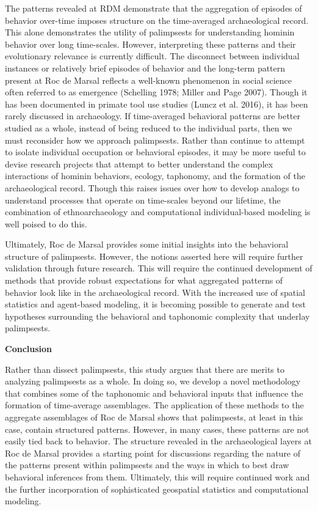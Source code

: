 \documentclass[smallextended]{svjour3}       %
\begin{document}
The patterns revealed at RDM demonstrate that the aggregation of
episodes of behavior over-time imposes structure on the time-averaged
archaeological record. This alone demonstrates the utility of
palimpsests for understanding hominin behavior over long time-scales.
However, interpreting these patterns and their evolutionary relevance is
currently difficult. The disconnect between individual instances or
relatively brief episodes of behavior and the long-term pattern present
at Roc de Marsal reflects a well-known phenomenon in social science
often referred to as emergence (Schelling 1978; Miller and Page 2007).
Though it has been documented in primate tool use studies (Luncz et al.
2016), it has been rarely discussed in archaeology. If time-averaged
behavioral patterns are better studied as a whole, instead of being
reduced to the individual parts, then we must reconsider how we approach
palimpsests. Rather than continue to attempt to isolate individual
occupation or behavioral episodes, it may be more useful to devise
research projects that attempt to better understand the complex
interactions of hominin behaviors, ecology, taphonomy, and the formation
of the archaeological record. Though this raises issues over how to
develop analogs to understand processes that operate on time-scales
beyond our lifetime, the combination of ethnoarchaeology and
computational individual-based modeling is well poised to do this.

Ultimately, Roc de Marsal provides some initial insights into the
behavioral structure of palimpsests. However, the notions asserted here
will require further validation through future research. This will
require the continued development of methods that provide robust
expectations for what aggregated patterns of behavior look like in the
archaeological record. With the increased use of spatial statistics and
agent-based modeling, it is becoming possible to generate and test
hypotheses surrounding the behavioral and taphonomic complexity that
underlay palimpsests.

\textbf{Conclusion}

Rather than dissect palimpsests, this study argues that there are merits
to analyzing palimpsests as a whole. In doing so, we develop a novel
methodology that combines some of the taphonomic and behavioral inputs
that influence the formation of time-average assemblages. The
application of these methods to the aggregate assemblages of Roc de
Marsal shows that palimpsests, at least in this case, contain structured
patterns. However, in many cases, these patterns are not easily tied
back to behavior. The structure revealed in the archaeological layers at
Roc de Marsal provides a starting point for discussions regarding the
nature of the patterns present within palimpsests and the ways in which
to best draw behavioral inferences from them. Ultimately, this will
require continued work and the further incorporation of sophisticated
geospatial statistics and computational modeling.
\end{document}
